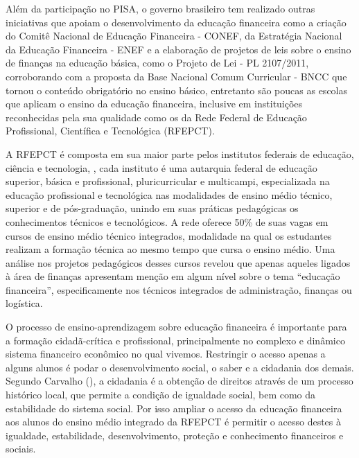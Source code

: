 Além da participação no PISA, o governo brasileiro tem realizado outras iniciativas que apoiam o desenvolvimento da educação financeira como a criação do Comitê Nacional de Educação Financeira - CONEF, da Estratégia Nacional da Educação Financeira - ENEF e a elaboração de projetos de leis sobre o ensino de finanças na educação básica, como o Projeto de Lei - PL 2107/2011, corroborando com a proposta da Base Nacional Comum Curricular - BNCC que tornou o conteúdo obrigatório no ensino básico, entretanto são poucas as escolas que aplicam o ensino da educação financeira, inclusive em instituições reconhecidas pela sua qualidade como os da Rede Federal de Educação Profissional, Científica e Tecnológica (RFEPCT).

A RFEPCT é composta em sua maior parte pelos institutos federais de educação, ciência e tecnologia, , cada instituto é uma autarquia federal de educação superior, básica e profissional, pluricurricular e multicampi, especializada na educação profissional e tecnológica nas modalidades de ensino médio técnico, superior e de pós-graduação, unindo em suas práticas pedagógicas os conhecimentos técnicos e tecnológicos. A rede oferece 50\% de suas vagas em cursos de ensino médio técnico integrados, modalidade na qual os estudantes realizam a formação técnica ao mesmo tempo que cursa o ensino médio. Uma análise nos projetos pedagógicos desses cursos revelou que apenas aqueles ligados à área de finanças apresentam menção em algum nível sobre o tema “educação financeira”, especificamente nos técnicos integrados de administração, finanças ou logística.

O processo de ensino-aprendizagem sobre educação financeira é importante para a formação cidadã-crítica e profissional, principalmente no complexo e dinâmico sistema financeiro econômico no qual vivemos. Restringir o acesso apenas a alguns alunos é podar o desenvolvimento social, o saber e a cidadania dos demais. Segundo Carvalho (\citeyear{carvalho2010}), a cidadania é a obtenção de direitos através de um processo histórico local, que permite a condição de igualdade social, bem como da estabilidade do sistema social. Por isso ampliar o acesso da educação financeira aos alunos do ensino médio integrado da RFEPCT é permitir o acesso destes à igualdade, estabilidade, desenvolvimento, proteção e conhecimento financeiros e sociais.

